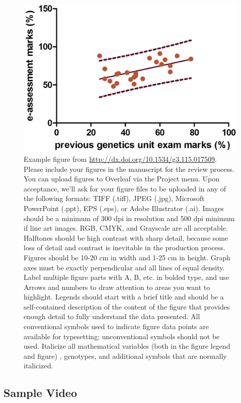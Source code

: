 \documentclass[9pt,twocolumn,twoside]{g3_article/gsag3jnl}
\begin{document}
\begin{figure}[htbp]
\renewcommand{\familydefault}{\sfdefault}\normalfont
\centering
\includegraphics[width=\linewidth]{images/example-figure-g3}
\caption{Example figure from \url{http://dx.doi.org/10.1534/g3.115.017509}. Please include your figures in the manuscript for the review process. You can upload figures to Overleaf via the Project menu. Upon acceptance, we'll ask for your figure files to be uploaded in any of the following formats: TIFF (.tiff), JPEG (.jpg), Microsoft PowerPoint (.ppt), EPS (.eps), or Adobe Illustrator (.ai).  Images should be a minimum of 300 dpi in resolution and 500 dpi minimum if line art images.  RGB, CMYK, and Grayscale are all acceptable. Halftones should be high contrast with sharp detail, because some loss of detail and contrast is inevitable in the production process. Figures should be 10-20 cm in width and 1-25 cm in height. Graph axes must be exactly perpendicular and all lines of equal density.
Label multiple figure parts with A, B, etc. in bolded type, and use Arrows and numbers to draw attention to areas you want to highlight. Legends should start with a brief title and should be a self-contained description of the content of the figure that provides enough detail to fully understand the data presented. All conventional symbols used to indicate figure data points are available for typesetting; unconventional symbols should not be used. Italicize all mathematical variables (both in the figure legend and figure) , genotypes, and additional symbols that are normally italicized.  
}%
\label{fig:spectrum}
\end{figure}

\subsection*{Sample Video}
\end{document}
